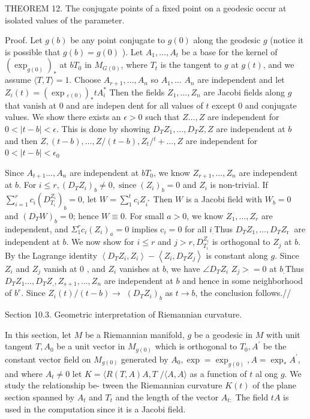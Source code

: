\documentclass[10pt]{article}
\begin{document}
THEOREM 12. The conjugate points of a fixed point on a geodesic occur at isolated values of the parameter.

Proof. Let $g(b)$ be any point conjugate to $g(0)$ along the geodesic $g$ (notice it is possible that $g(b)=g(0)$ ). Let $A_{1}, \ldots, A_{t}$ be a base for the kernel of $\left(\exp _{g(0)}\right)_{*}$ at $b T_{0}$ in $M_{G(0)}$, where $T_{t}$ is the tangent to $g$ at $g(t)$, and we assume $\langle T, T\rangle=1$. Choose $A_{r+1}, \ldots, A_{n}$ so $A_{1}, \ldots$ $A_{n}$ are independent and let $Z_{i}(t)=\left(\exp { }_{\varepsilon(0)}\right)_{*} t A_{i}^{*}$ Then the fields $Z_{1}, \ldots, Z_{n}$ are Jacobi fields along $g$ that vanish at 0 and are indepen dent for all values of $t$ except 0 and conjugate values. We show there exists an $\epsilon>0$ such that $Z \ldots, Z$ are independent for $0<|t-b|<\epsilon .$ This is done by showing $D_{T} Z_{1}, \ldots, D_{T} Z, Z$ are independent at $b$ and then $Z,(t-b), \ldots, Z /(t-b), Z{ }_{t} /{ }^{t}+\ldots, Z$ are independent for $0<|t-b|<\epsilon_{0}$

Since $A_{t+1} \ldots, A_{n}$ are independent at $b T_{0}$, we know $Z_{r+1}, \ldots, Z_{n}$ are independent at $b .$ For $i \leq r,\left(D_{T} Z_{i}\right)_{b} \neq 0, \operatorname{since}\left(Z_{i}\right)_{b}=0$ and $Z_{i}$ is non-trivial. If $\sum_{i=1}^{r} c_{i}\left(D_{T_{i}}^{Z_{i}}\right)_{b}=0$, let $W=\sum_{1}^{t} c_{i} Z_{i^{*}}$ Then $W$ is a Jacobi field with $W_{b}=0$ and $\left(D_{T} W\right)_{b}=0$; hence $W \equiv 0$. For small $a>0$, we know $Z_{1}, \ldots, Z_{r}$ are independent, and $\Sigma_{1}^{r} c_{i}\left(Z_{i}\right)_{a}=0$ implies $\mathrm{c}_{i}=0$ for all $i_{.}$Thus $D_{T} Z_{1}, \ldots, D_{T} Z_{\text {r }}$ are independent at $b .$ We now show for $i \leq r$ and $j>r, D_{T_{i}}^{Z_{i}}$ is orthogonal to $Z_{j}$ at $b$. By the Lagrange identity $\left\langle D_{T} Z_{i}, Z_{i}\right\rangle-\left\langle Z_{i}, D_{T} Z_{j}\right\rangle$ is constant along $g$. Since $Z_{i}$ and $Z_{j}$ vanish at 0 , and $Z_{i}$ vanishes at $b$, we have $\angle D_{T} Z_{i}$ $Z_{j}>=0$ at $b_{.}$Thus $D_{T} Z_{1} \ldots, D_{T} Z_{,}, Z_{s+1}, \ldots, Z_{n}$ are independent at $b$ and hence in some neighborhood of $b^{r}$. Since $Z_{i}(t) /(t-b) \rightarrow$ $\left(D_{T} Z_{i}\right)_{b}$ as $t \rightarrow b$, the conclusion follows.//

Section 10.3. Geometric interpretation of Riemannian curvature.

In this section, let $M$ be a Riemannian manifold, $g$ be a geodesic in $M$ with unit tangent $T, A_{0}$ be a unit vector in $M_{g(0)}$ which is orthogonal to $T_{0}, A^{\prime}$ be the constant vector field on $M_{g(0)}$ generated by $A_{0}, \exp =\exp _{g(0)}, A=\exp _{*} A^{\prime}$, and where $A_{t} \neq 0$ let $K=\langle R(T, A) A, T$ $/\langle A, A\rangle$ as a function of $t$ al ong $g$. We study the relationship be- tween the Riemannian curvature $K(t)$ of the plane section spanned by $A_{t}$ and $T_{t}$ and the length of the vector $A_{t:}$ The field $t A$ is used in the computation since it is a Jacobi field.
\end{document}
